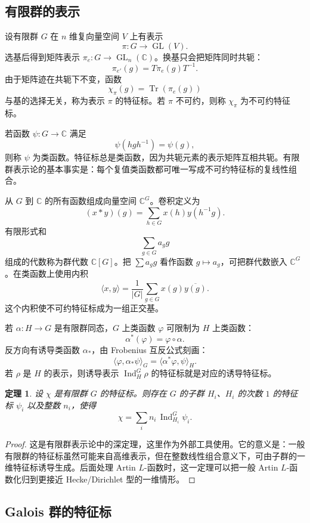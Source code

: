 \documentclass[11pt,a4paper,openany]{ctexbook}
\numberwithin{equation}{chapter}
\newcommand{\C}{\mathbb{C}}
\newcommand{\GL}{\operatorname{GL}}
\theoremstyle{plain}
\newtheorem{theorem}{定理}[chapter]
\theoremstyle{definition}
\theoremstyle{remark}
\begin{document}
\subsection{有限群的表示}

设有限群 $G$ 在 $n$ 维复向量空间 $V$ 上有表示
\[
\pi:G\longrightarrow \GL(V).
\]
选基后得到矩阵表示 $\pi_e:G\to\GL_n(\C)$。换基只会把矩阵同时共轭：
\[
\pi_{e'}(g)=T\pi_e(g)T^{-1}.
\]
由于矩阵迹在共轭下不变，函数
\[
\chi_\pi(g)=\operatorname{Tr}(\pi_e(g))
\]
与基的选择无关，称为表示 $\pi$ 的特征标。若 $\pi$ 不可约，则称 $\chi_\pi$ 为不可约特征标。

若函数 $\psi:G\to\C$ 满足
\[
\psi(hgh^{-1})=\psi(g),
\]
则称 $\psi$ 为类函数。特征标总是类函数，因为共轭元素的表示矩阵互相共轭。有限群表示论的基本事实是：每个复值类函数都可唯一写成不可约特征标的复线性组合。

从 $G$ 到 $\C$ 的所有函数组成向量空间 $\C^G$。卷积定义为
\[
(x*y)(g)=\sum_{h\in G}x(h)y(h^{-1}g).
\]
有限形式和
\[
\sum_{g\in G}a_g g
\]
组成的代数称为群代数 $\C[G]$。把 $\sum a_gg$ 看作函数 $g\mapsto a_g$，可把群代数嵌入 $\C^G$。在类函数上使用内积
\[
\langle x,y\rangle=\frac1{|G|}\sum_{g\in G}x(g)\overline{y(g)}.
\]
这个内积使不可约特征标成为一组正交基。

若 $\alpha:H\to G$ 是有限群同态，$G$ 上类函数 $\varphi$ 可限制为 $H$ 上类函数：
\[
\alpha^*(\varphi)=\varphi\circ\alpha.
\]
反方向有诱导类函数 $\alpha_*$，由 Frobenius 互反公式刻画：
\[
\langle \varphi,\alpha_*\psi\rangle_G
=\langle \alpha^*\varphi,\psi\rangle_H.
\]
若 $\rho$ 是 $H$ 的表示，则诱导表示 $\operatorname{Ind}_H^G\rho$ 的特征标就是对应的诱导特征标。

\begin{theorem}
设 $\chi$ 是有限群 $G$ 的特征标。则存在 $G$ 的子群 $H_i$、$H_i$ 的次数 $1$ 的特征标 $\psi_i$ 以及整数 $n_i$，使得
\[
\chi=\sum_i n_i\,\operatorname{Ind}_{H_i}^G\psi_i.
\]
\end{theorem}

\begin{proof}
这是有限群表示论中的深定理，这里作为外部工具使用。它的意义是：一般有限群的特征标虽然可能来自高维表示，但在整数线性组合意义下，可由子群的一维特征标诱导生成。后面处理 Artin $L$-函数时，这一定理可以把一般 Artin $L$-函数化归到更接近 Hecke/Dirichlet 型的一维情形。
\end{proof}

\subsection{Galois 群的特征标}
\end{document}
